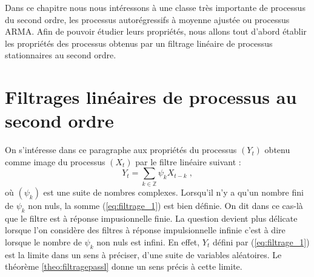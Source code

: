 
Dans ce chapitre nous nous int\'eressons \`a une classe tr\`es importante
de processus du second ordre, les processus autor\'egressifs \`a
moyenne ajust\'ee ou processus ARMA. Afin de pouvoir \'etudier
leurs propri\'et\'es, nous allons tout d'abord \'etablir les propri\'et\'es
des processus obtenus par un filtrage lin\'eaire de processus stationnaires au
second ordre.


\section{Filtrages lin\'eaires de processus au second ordre}


On s'int\'eresse dans ce paragraphe aux propri\'et\'es du processus
$(Y_t)$ obtenu comme image du processus $(X_t)$ par le filtre
lin\'eaire suivant :
\begin{equation}\label{eq:filtrage_1}
Y_t=\sum_{k\in\mathbb{Z}}\psi_k X_{t-k}\;,
\end{equation}
o\`u $(\psi_k)$ est une suite de nombres complexes.
Lorsqu'il n'y a qu'un nombre fini de $\psi_k$ non nuls,
la somme (\ref{eq:filtrage_1}) est bien d\'efinie. On dit dans ce cas-l\`a
que le filtre est \`a r\'eponse impusionnelle finie.
La question devient plus d\'elicate lorsque l'on consid\`ere des
filtres \`a r\'eponse impulsionnelle infinie c'est \`a dire lorsque
le nombre de $\psi_k$ non nuls est infini. En effet, $Y_t$ d\'efini par
(\ref{eq:filtrage_1}) est la limite dans un sens \`a pr\'eciser, d'une
suite de variables al\'eatoires. Le th\'eor\`eme \ref{theo:filtragepassl}
donne un sens pr\'ecis \`a cette limite.




